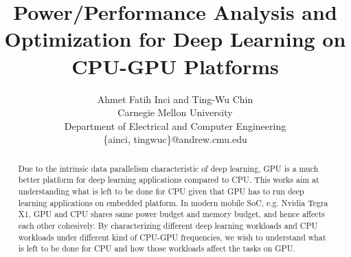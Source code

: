 \documentclass[times, 10pt,twocolumn]{article}
\begin{document}
\title{Power/Performance Analysis and Optimization for Deep Learning on CPU-GPU Platforms}

\author{Ahmet Fatih Inci and Ting-Wu Chin  \\
Carnegie Mellon University\\ Department of Electrical and Computer Engineering \\ \{ainci, tingwuc\}@andrew.cmu.edu\\
}
\maketitle
\thispagestyle{empty}

\begin{abstract}
    Due to the intrinsic data parallelism characteristic of deep learning, GPU is a much better platform for deep learning applications compared to CPU. This works aim at understanding what is left to be done for CPU given that GPU has to run deep learning applications on embedded platform. In modern mobile SoC, e.g. Nvidia Tegra X1, GPU and CPU shares same power budget and memory budget, and hence affects each other cohesively. By characterizing different deep learning workloads and CPU workloads under different kind of CPU-GPU frequencies, we wish to understand what is left to be done for CPU and how those workloads affect the tasks on GPU. 

\end{abstract}











\end{document}
